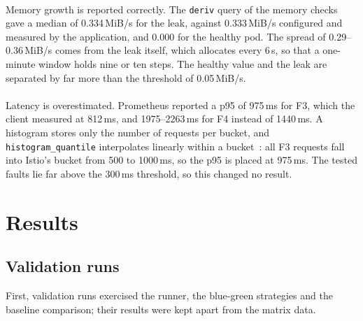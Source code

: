 \paragraph{} Memory growth is reported correctly. The \texttt{deriv} query of the memory checks gave a median of 0.334\,MiB/s for the leak, against 0.333\,MiB/s configured and measured by the application, and 0.000 for the healthy pod. The spread of 0.29--0.36\,MiB/s comes from the leak itself, which allocates every 6\,s, so that a one-minute window holds nine or ten steps. The healthy value and the leak are separated by far more than the threshold of 0.05\,MiB/s.

\paragraph{} Latency is overestimated. Prometheus reported a p95 of 975\,ms for F3, which the client measured at 812\,ms, and 1975--2263\,ms for F4 instead of 1440\,ms. A histogram stores only the number of requests per bucket, and \texttt{histogram\_quantile} interpolates linearly within a bucket~\cite{PromHistograms}: all F3 requests fall into Istio's bucket from 500 to 1000\,ms, so the p95 is placed at 975\,ms. The tested faults lie far above the 300\,ms threshold, so this changed no result.

\section{Results}
\label{sec:EvalResults}

\subsection{Validation runs}
\label{sec:EvalV2Validation}
First, validation runs exercised the runner, the blue-green strategies and the baseline comparison; their results were kept apart from the matrix data. 

